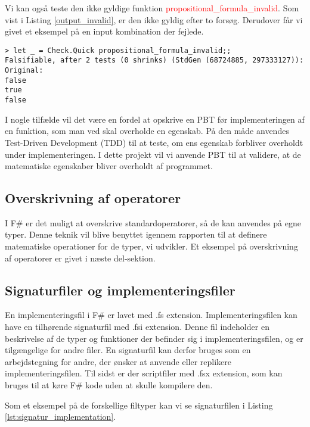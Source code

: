 Vi kan også teste den ikke gyldige funktion \textcolor{red}{propositional\_formula\_invalid}. Som vist i Listing \ref{output_invalid}, er den ikke gyldig efter to forsøg. Derudover får vi givet et eksempel på en input kombination der fejlede.

\begin{lstlisting}[style=output, label={output_invalid}, caption={Output ved PBT af \textcolor{red}{propositional\_formula\_invalid}}]
> let _ = Check.Quick propositional_formula_invalid;;
Falsifiable, after 2 tests (0 shrinks) (StdGen (68724885, 297333127)):
Original:
false
true
false
\end{lstlisting}

I nogle tilfælde vil det være en fordel at opskrive en PBT før implementeringen af en funktion, som man ved skal overholde en egenskab. På den måde anvendes Test-Driven Development (TDD) til at teste, om ens egenskab forbliver overholdt under implementeringen. I dette projekt vil vi anvende PBT til at validere, at de matematiske egenskaber bliver overholdt af programmet.



\subsection{Overskrivning af operatorer}
I F\# er det muligt at overskrive standardoperatorer, så de kan anvendes på egne typer. Denne teknik vil blive benyttet igennem rapporten til at definere matematiske operationer for de typer, vi udvikler. Et eksempel på overskrivning af operatorer er givet i næste del-sektion.

\subsection{Signaturfiler og implementeringsfiler}
En implementeringsfil i F\# er lavet med .fs extension. Implementeringsfilen kan have en tilhørende signaturfil med .fsi extension. Denne fil indeholder en beskrivelse af de typer og funktioner der befinder sig i implementeringsfilen, og er tilgængelige for andre filer. En signaturfil kan derfor bruges som en arbejdstegning for andre, der ønsker at anvende eller replikere implementeringsfilen. Til sidst er der scriptfiler med .fsx extension, som kan bruges til at køre F\# kode uden at skulle kompilere den.

Som et eksempel på de forskellige filtyper kan vi se signaturfilen i Listing \ref{lst:signatur_implementation}.
\newpage


